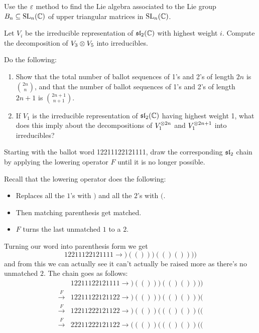 \documentclass[12pt]{memoir}
\begin{document}
\begin{Ej}
    Use the $\varepsilon$ method to ﬁnd the Lie algebra associated to the Lie group $B_n\subseteq\mathrm{SL}_n(\mathbb{C})$ of upper
triangular matrices in $\mathrm{SL}_n(\mathbb{C})$.
\end{Ej}

\begin{Ej}
    Let $V_i$ be the irreducible representation of $\mathfrak{sl}_2(\mathbb{C})$ with highest weight $i$. Compute the
decomposition of $V_3\otimes V_5$ into irreducibles.
\end{Ej}

\begin{Ej}
    Do the following:
    \begin{enumerate}
        \item Show that the total number of ballot sequences of 1's and 2's of length $2n$ is $\binom{2n}{n}$, and
        that the number of ballot sequences of 1's and 2's of length $2n + 1$ is $\binom{2n+1}{n+1}$.
        \item If $V_1$ is the irreducible representation of $\mathfrak{sl}_2(\mathbb{C})$ having highest weight 1, what does this
        imply about the decompositions of $V_1^{\otimes 2n}$ and $V_1^{\otimes 2n+1}$ into irreducibles?
    \end{enumerate}
\end{Ej}
\begin{ptcbr}
    
\end{ptcbr}
\begin{Ej}
    Starting with the ballot word 12211122121111, draw the corresponding $\mathfrak{sl}_2$ chain by applying the lowering operator $F$ until it is no longer possible.
\end{Ej}

\begin{ptcbr}
    Recall that the lowering operator does the following:
    \begin{itemize}
        \item Replaces all the $1$'s with $)$ and all the $2$'s with $($.
        \item Then matching parenthesis get matched. 
        \item $F$ turns the last unmatched $1$ to a $2$.
    \end{itemize}
    Turning our word into parenthesis form we get
    $$12211122121111\to)(()))(()())))$$
    and from this we can actually see it can't actually be raised more as there's no unmatched $2$. The chain goes as follows:
    \begin{align*}
                       &12211122121111\to)(()))(()())))\\
        \xrightarrow{F}&12211122121122\to)(()))(()()))(\\
        \xrightarrow{F}&12211222121122\to)(())((()())((\\
        \xrightarrow{F}&22211222121122\to((())((()())((
    \end{align*}
\end{ptcbr}
\end{document}
